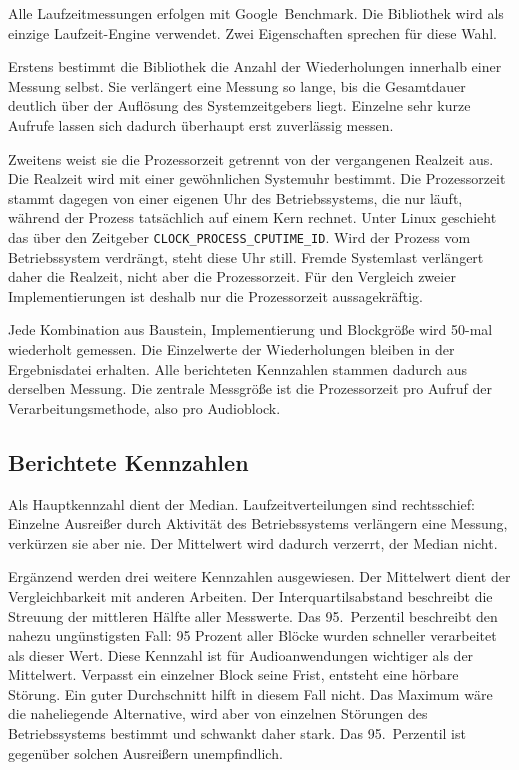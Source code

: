 Alle Laufzeitmessungen erfolgen mit Google~Benchmark. Die Bibliothek wird als
einzige Laufzeit-Engine verwendet. Zwei Eigenschaften sprechen für diese
Wahl.

Erstens bestimmt die Bibliothek die Anzahl der Wiederholungen innerhalb einer
Messung selbst. Sie verlängert eine Messung so lange, bis die Gesamtdauer
deutlich über der Auflösung des Systemzeitgebers liegt. Einzelne sehr kurze
Aufrufe lassen sich dadurch überhaupt erst zuverlässig messen.

Zweitens weist sie die Prozessorzeit getrennt von der vergangenen Realzeit
aus. Die Realzeit wird mit einer gewöhnlichen Systemuhr bestimmt. Die
Prozessorzeit stammt dagegen von einer eigenen Uhr des Betriebssystems, die
nur läuft, während der Prozess tatsächlich auf einem Kern rechnet. Unter
Linux geschieht das über den Zeitgeber \texttt{CLOCK\_PROCESS\_CPUTIME\_ID}.
Wird der Prozess vom Betriebssystem verdrängt, steht diese Uhr still. Fremde
Systemlast verlängert daher die Realzeit, nicht aber die Prozessorzeit. Für
den Vergleich zweier Implementierungen ist deshalb nur die Prozessorzeit
aussagekräftig.

Jede Kombination aus Baustein, Implementierung und Blockgröße wird 50-mal
wiederholt gemessen. Die Einzelwerte der Wiederholungen bleiben in der
Ergebnisdatei erhalten. Alle berichteten Kennzahlen stammen dadurch aus
derselben Messung. Die zentrale Messgröße ist die Prozessorzeit pro Aufruf
der Verarbeitungsmethode, also pro Audioblock.

\subsection{Berichtete Kennzahlen}

Als Hauptkennzahl dient der Median. Laufzeitverteilungen sind rechtsschief:
Einzelne Ausreißer durch Aktivität des Betriebssystems verlängern eine
Messung, verkürzen sie aber nie. Der Mittelwert wird dadurch verzerrt, der
Median nicht.

Ergänzend werden drei weitere Kennzahlen ausgewiesen. Der Mittelwert dient
der Vergleichbarkeit mit anderen Arbeiten. Der Interquartilsabstand
beschreibt die Streuung der mittleren Hälfte aller Messwerte. Das
95.~Perzentil beschreibt den nahezu ungünstigsten Fall: 95 Prozent aller
Blöcke wurden schneller verarbeitet als dieser Wert. Diese Kennzahl ist für
Audioanwendungen wichtiger als der Mittelwert. Verpasst ein einzelner Block
seine Frist, entsteht eine hörbare Störung. Ein guter Durchschnitt hilft in
diesem Fall nicht. Das Maximum wäre die naheliegende Alternative, wird aber
von einzelnen Störungen des Betriebssystems bestimmt und schwankt daher stark.
Das 95.~Perzentil ist gegenüber solchen Ausreißern unempfindlich.

